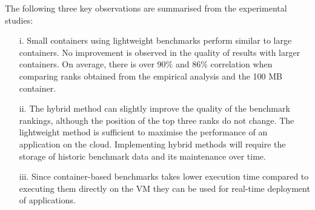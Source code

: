 The following three key observations are summarised from the experimental studies:

\begin{itemize}
\item[i.] Small containers using lightweight benchmarks perform similar to large containers. No improvement is observed in the quality of results with larger containers. On average, there is over 90\% and 86\% correlation when comparing ranks obtained from the empirical analysis and the 100 MB container.

\item[ii.] The hybrid method can slightly improve the quality of the benchmark rankings, although the position of the top three ranks do not change. The lightweight method is sufficient to maximise the performance of an application on the cloud. Implementing hybrid methods will require the storage of historic benchmark data and its maintenance over time.

\item[iii.] Since container-based benchmarks takes lower execution time compared to executing them directly on the VM they can be used for real-time deployment of applications.

\end{itemize}
 
